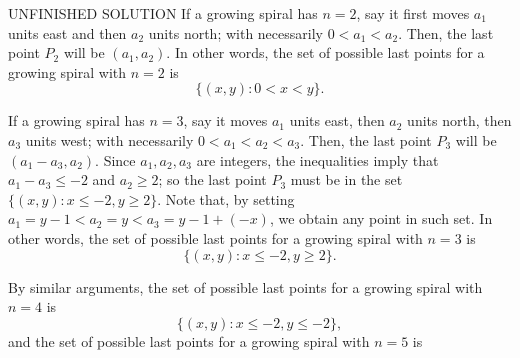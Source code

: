 \begin{sol}{UNFINISHED SOLUTION}{}
	If a growing spiral has \(n = 2\), say it first moves \(a_1\) units east and then \(a_2\) units north; with necessarily \(0 < a_1 < a_2\). Then, the last point \(P_2\) will be \((a_1, a_2)\). In other words, the set of possible last points for a growing spiral with \(n=2\) is \[
		\{(x, y) : 0 < x < y\}.
	\]

	If a growing spiral has \(n = 3\), say it moves \(a_1\) units east, then \(a_2\) units north, then \(a_3\) units west; with necessarily \(0 < a_1 < a_2 < a_3\).
	Then, the last point \(P_3\) will be \((a_1 - a_3, a_2)\).
	Since \(a_1, a_2, a_3\) are integers, the inequalities imply that  \(a_1 - a_3 \leq -2\) and  \(a_2 \geq 2\); so the last point \(P_3\) must be in the set \(\{(x, y) : x \leq -2, y \geq 2\}\).
	Note that, by setting \(a_1 = y - 1 < a_2 = y < a_3 = y - 1 + (-x)\), we obtain any point in such set.
	In other words, the set of possible last points for a growing spiral with \(n = 3\) is \[
		\{(x, y) : x \leq -2, y \geq 2\}.
	\]

	By similar arguments, the set of possible last points for a growing spiral with \(n = 4\) is \[
		\{(x, y) : x \leq -2, y \leq -2\},
	\]
	and the set of possible last points for a growing spiral with \(n = 5\) is 
\end{sol}
